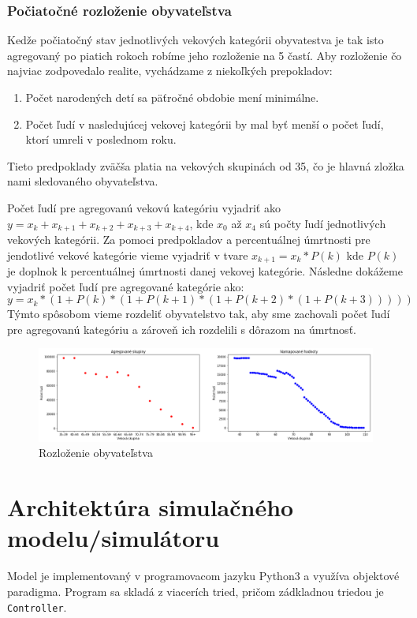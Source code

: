\documentclass[a4paper, 11pt]{article}
\begin{document}
\subsubsection*{Počiatočné rozloženie obyvateľstva}
Kedže počiatočný stav jednotlivých vekových kategórii obyvatestva je tak isto agregovaný po piatich rokoch robíme jeho rozloženie na 5 častí. Aby rozloženie čo najviac zodpovedalo realite, vychádzame z niekoľkých prepokladov:
\begin{enumerate}
\item Počet narodených detí sa päťročné obdobie mení minimálne.
\item Počet ľudí v nasledujúcej vekovej kategórii by mal byť menší o počet ľudí, ktorí umreli v poslednom roku.
\end{enumerate}
Tieto predpoklady zväčša platia na vekových skupinách od 35, čo je hlavná zložka nami sledovaného obyvateľstva.

Počet ľudí pre agregovanú vekovú kategóriu vyjadriť ako $y = x_{k} + x_{k+1} + x_{k+2} + x_{k+3} + x_{k+4}$, kde $x_0$ až $x_4$ sú počty ľudí jednotlivých vekových kategórii. Za pomoci predpokladov a percentuálnej úmrtnosti pre jendotlivé vekové kategórie vieme vyjadriť v tvare $x_{k+1}=x_{k}*P(k)$ kde $P(k)$ je doplnok k percentuálnej úmrtnosti danej vekovej kategórie. Následne dokážeme vyjadriť počet ľudí pre agregované kategórie ako:
$$y = x_k*(1 + P(k)*(1 + P(k+1)*(1 + P(k+2) * (1 + P(k+3)))))$$
Týmto spôsobom vieme rozdeliť obyvatelstvo tak, aby sme zachovali počet ľudí pre agregovanú kategóriu a zároveň ich rozdelili s dôrazom na úmrtnosť.
\begin{figure}[H]
\centering
\includegraphics[width=1\textwidth]{exp_3}
\caption{Rozloženie obyvateľstva}
\end{figure}

\section{Architektúra simulačného modelu/simulátoru}
Model je implementovaný v programovacom jazyku Python3 a využíva objektové paradigma. Program sa skladá z viacerích tried, pričom zádkladnou triedou je \texttt{Controller}.
\end{document}
